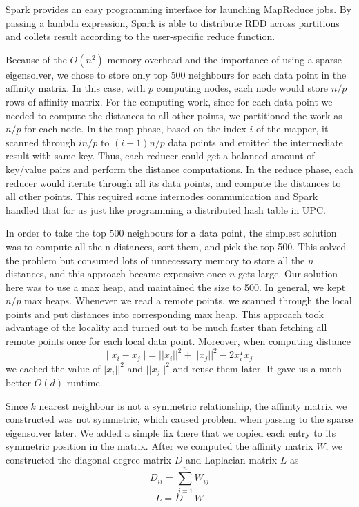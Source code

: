 \documentclass{acm_proc_article-sp}
\begin{document}
Spark provides an easy programming interface for launching MapReduce jobs. By passing a lambda expression, Spark is able to distribute RDD across partitions and collets result according to the user-specific reduce function. 

Because of the $O(n^2)$ memory overhead and the importance of using a sparse eigensolver, we chose to store only top 500 neighbours for each data point in the affinity matrix. In this case, with $p$ computing nodes, each node would store $n/p$ rows of affinity matrix. For the computing work, since for each data point we needed to compute the distances to all other points, we partitioned the work as $n/p$ for each node. In the map phase, based on the index $i$ of the mapper, it scanned through $in/p$ to $(i+1)n/p$ data points and emitted the intermediate result with same key. Thus, each reducer could get a balanced amount of key/value pairs and perform the distance computations. In the reduce phase, each reducer would iterate through all its data points, and compute the distances to all other points. This required some internodes communication and Spark handled that for us just like programming a distributed hash table in UPC.

In order to take the top 500 neighbours for a data point, the simplest solution was to compute all the n distances, sort them, and pick the top 500. This solved the problem but consumed lots of unnecessary memory to store all the $n$ distances, and this approach became expensive once $n$ gets large. Our solution here was to use a max heap, and maintained the size to 500. In general, we kept $n/p$ max heaps. Whenever we read a remote points, we scanned through the local points and put distances into corresponding max heap. This approach took advantage of the locality and turned out to be much faster than fetching all remote points once for each local data point. Moreover, when computing distance $$||x_i - x_j|| = ||x_i||^2 + ||x_j||^2 - 2x_i^Tx_j$$
we cached the value of $|x_i||^2$ and $||x_j||^2$ and reuse them later. It gave us a much better $O(d)$ runtime. 

Since $k$ nearest neighbour is not a symmetric relationship, the affinity matrix we constructed was not symmetric, which caused problem when passing to the sparse eigensolver later. We added a simple fix there that we copied each entry to its symmetric position in the matrix. After we computed the affinity matrix $W$, we constructed the diagonal degree matrix $D$ and Laplacian matrix $L$ as 
$$ D_{ii} = \sum_{j=1}^nW_{ij}$$
$$ L = D - W$$
\end{document}
